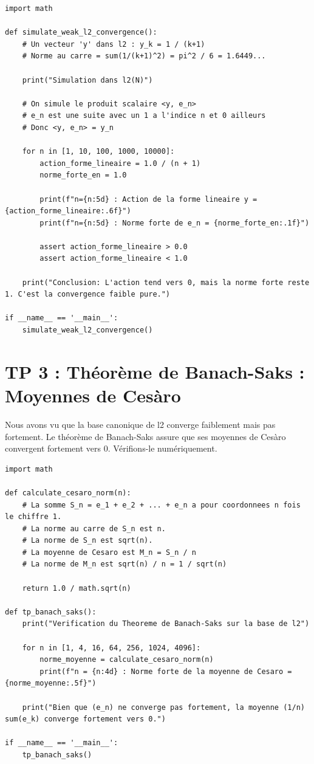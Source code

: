 \documentclass[11pt,a4paper]{article}
\begin{document}
\begin{lstlisting}
import math

def simulate_weak_l2_convergence():
    # Un vecteur 'y' dans l2 : y_k = 1 / (k+1)
    # Norme au carre = sum(1/(k+1)^2) = pi^2 / 6 = 1.6449...

    print("Simulation dans l2(N)")

    # On simule le produit scalaire <y, e_n>
    # e_n est une suite avec un 1 a l'indice n et 0 ailleurs
    # Donc <y, e_n> = y_n

    for n in [1, 10, 100, 1000, 10000]:
        action_forme_lineaire = 1.0 / (n + 1)
        norme_forte_en = 1.0

        print(f"n={n:5d} : Action de la forme lineaire y = {action_forme_lineaire:.6f}")
        print(f"n={n:5d} : Norme forte de e_n = {norme_forte_en:.1f}")

        assert action_forme_lineaire > 0.0
        assert action_forme_lineaire < 1.0

    print("Conclusion: L'action tend vers 0, mais la norme forte reste 1. C'est la convergence faible pure.")

if __name__ == '__main__':
    simulate_weak_l2_convergence()
\end{lstlisting}


\section{TP 3 : Théorème de Banach-Saks : Moyennes de Cesàro}

Nous avons vu que la base canonique de l2 converge faiblement mais pas fortement. Le théorème de Banach-Saks assure que ses moyennes de Cesàro convergent fortement vers 0. Vérifions-le numériquement.

\begin{lstlisting}
import math

def calculate_cesaro_norm(n):
    # La somme S_n = e_1 + e_2 + ... + e_n a pour coordonnees n fois le chiffre 1.
    # La norme au carre de S_n est n.
    # La norme de S_n est sqrt(n).
    # La moyenne de Cesaro est M_n = S_n / n
    # La norme de M_n est sqrt(n) / n = 1 / sqrt(n)

    return 1.0 / math.sqrt(n)

def tp_banach_saks():
    print("Verification du Theoreme de Banach-Saks sur la base de l2")

    for n in [1, 4, 16, 64, 256, 1024, 4096]:
        norme_moyenne = calculate_cesaro_norm(n)
        print(f"n = {n:4d} : Norme forte de la moyenne de Cesaro = {norme_moyenne:.5f}")

    print("Bien que (e_n) ne converge pas fortement, la moyenne (1/n) sum(e_k) converge fortement vers 0.")

if __name__ == '__main__':
    tp_banach_saks()
\end{lstlisting}
\end{document}
